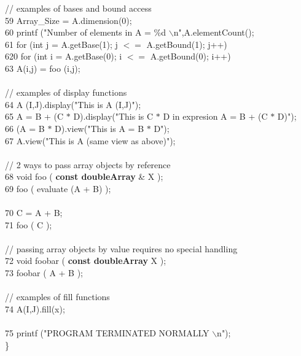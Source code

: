 {\begin{tabbing}
    \>// examples of bases and bound access \\
59  \>\> Array\_Size = A.dimension(0); \\
60  \>\> printf ("Number of elements in A = \%d $\backslash$n",A.elementCount(); \\
61  \>\> for (int j = A.getBase(1); j $<=$ A.getBound(1); j++) \\
620 \>\>\> for (int i = A.getBase(0); i $<=$ A.getBound(0); i++) \\
63  \>\>\>\>  A(i,j) = foo (i,j); \\
    \\
    \>// examples of display functions \\
64  \>\> A (I,J).display("This is A (I,J)"); \\
65  \>\> A = B + (C $*$ D).display("This is C $*$ D in expresion A = B + (C $*$ D)"); \\
66  \>\> (A = B $*$ D).view("This is A = B $*$ D"); \\
67  \>\> A.view("This is A (same view as above)"); \\
    \\
    \>// 2 ways to pass array objects by reference \\
68  \>\> void foo ( {\bf const doubleArray} \& X ); \\
69  \>\> foo ( evaluate (A + B) ); \\
    \\
70  \>\> C = A + B; \\
71  \>\> foo ( C ); \\
    \\
    \>// passing array objects by value requires no special handling \\
72  \>\> void foobar ( {\bf const doubleArray} X ); \\
73  \>\> foobar ( A + B ); \\
    \\
    \>// examples of fill functions \\
74  \>\> A(I,J).fill(x); \\
    \\
75  \>\> printf ("PROGRAM TERMINATED NORMALLY $\backslash$n"); \\ 
    \> \} \\ 
\end{tabbing}

}
















